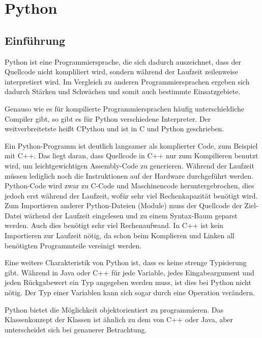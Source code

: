 \section{Python}
	\subsection{Einführung}
		Python ist eine Programmiersprache, die sich dadurch auszeichnet, dass der Quellcode nicht kompliliert wird, sondern während der Laufzeit zeilenweise interpretiert wird. Im Vergleich zu anderen Programmiersprachen ergeben sich dadurch Stärken und Schwächen und somit auch bestimmte Einsatzgebiete. 
		
		Genauso wie es für kompilierte Programmiersprachen häufig unterschieldiche Compiler gibt, so gibt es für Python verschiedene Interpreter. Der weitverbreitetste heißt CPython und ist in C und Python geschrieben.
		
		Ein Python-Programm ist deutlich langsamer als komplierter Code, zum Beispiel mit C++. Das liegt daran, dass Quellcode in C++ nur zum Kompilieren benutzt wird, um leichtgewichtigen Assembly-Code zu generieren. Während der Laufzeit müssen lediglich noch die Instruktionen auf der Hardware durchgeführt werden.
		Python-Code wird zwar zu C-Code und Maschinencode heruntergebrochen, dies jedoch erst während der Laufzeit, wofür sehr viel Rechenkapazität benötigt wird. Zum Importieren anderer Python-Dateien (Module) muss der Quellcode der Ziel-Datei wärhend der Laufzeit eingelesen und zu einem Syntax-Baum geparst werden. Auch dies benötigt sehr viel Rechenaufwand. In C++ ist kein Importieren zur Laufzeit nötig, da schon beim Komplieren und Linken all benötigten Programmteile vereinigt werden.
		
		Eine weitere Charakteristik von Python ist, dass es keine strenge Typisierung gibt. Während in Java oder C++ für jede Variable, jedes Eingabeargument und jeden Rückgabewert ein Typ angegeben werden muss, ist dies bei Python nicht nötig. Der Typ einer Variablen kann sich sogar durch eine Operation verändern.
		
		Python bietet die Möglichkeit objektorientiert zu programmieren. Das Klassenkonzept der Klassen ist ähnlich zu dem von C++ oder Java, aber unterscheidet sich bei genauerer Betrachtung.
		
